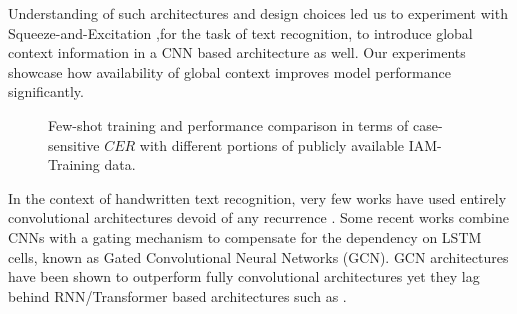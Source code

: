 \documentclass{article}
\begin{document}
Understanding of such architectures and design choices led us to experiment with Squeeze-and-Excitation \cite{hu2018squeeze} ,for the task of text recognition, to introduce global context information in a CNN based architecture\cite{han2020contextnet} as well. Our experiments showcase how availability of global context improves model performance significantly.

\begin{figure}[H]
\centering
{}
     \caption{Few-shot training and performance comparison in terms of case-sensitive $CER$ with different portions of publicly available IAM-Training data.}
     \label{fig:comparison2}
\end{figure}


In the context of handwritten text recognition, very few works have used entirely convolutional architectures devoid of any recurrence \cite{Chaudhary2021EASTER,ptucha2019intelligent,yousef2020accurate}. Some recent works\cite{ingle2019scalable,coquenet2020recurrence} combine CNNs with a gating mechanism to compensate for the dependency on LSTM cells, known as Gated Convolutional Neural Networks (GCN). GCN architectures have been shown to outperform fully convolutional architectures yet they lag behind RNN/Transformer based architectures such as \cite{kang2020pay,diaz2021rethinking,li2021trocr}. 
\end{document}
